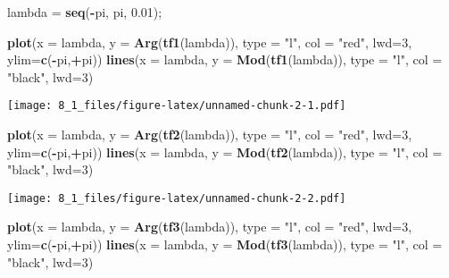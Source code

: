 \documentclass[]{article}
\newenvironment{Shaded}{\begin{snugshade}}{\end{snugshade}}
\newcommand{\KeywordTok}[1]{\textcolor[rgb]{0.13,0.29,0.53}{\textbf{#1}}}
\newcommand{\DataTypeTok}[1]{\textcolor[rgb]{0.13,0.29,0.53}{#1}}
\newcommand{\DecValTok}[1]{\textcolor[rgb]{0.00,0.00,0.81}{#1}}
\newcommand{\FloatTok}[1]{\textcolor[rgb]{0.00,0.00,0.81}{#1}}
\newcommand{\StringTok}[1]{\textcolor[rgb]{0.31,0.60,0.02}{#1}}
\newcommand{\OperatorTok}[1]{\textcolor[rgb]{0.81,0.36,0.00}{\textbf{#1}}}
\newcommand{\NormalTok}[1]{#1}
\begin{document}
\begin{Shaded}
\begin{Highlighting}[]
\NormalTok{lambda =}\StringTok{ }\KeywordTok{seq}\NormalTok{(}\OperatorTok{-}\NormalTok{pi, pi, }\FloatTok{0.01}\NormalTok{);}

\KeywordTok{plot}\NormalTok{(}\DataTypeTok{x =}\NormalTok{ lambda, }\DataTypeTok{y =} \KeywordTok{Arg}\NormalTok{(}\KeywordTok{tf1}\NormalTok{(lambda)), }\DataTypeTok{type =} \StringTok{"l"}\NormalTok{, }\DataTypeTok{col =} \StringTok{"red"}\NormalTok{, }\DataTypeTok{lwd=}\DecValTok{3}\NormalTok{, }\DataTypeTok{ylim=}\KeywordTok{c}\NormalTok{(}\OperatorTok{-}\NormalTok{pi,}\OperatorTok{+}\NormalTok{pi))}
\KeywordTok{lines}\NormalTok{(}\DataTypeTok{x =}\NormalTok{ lambda, }\DataTypeTok{y =} \KeywordTok{Mod}\NormalTok{(}\KeywordTok{tf1}\NormalTok{(lambda)), }\DataTypeTok{type =} \StringTok{"l"}\NormalTok{, }\DataTypeTok{col =} \StringTok{"black"}\NormalTok{, }\DataTypeTok{lwd=}\DecValTok{3}\NormalTok{)}
\end{Highlighting}
\end{Shaded}

\texttt{[image: 8\_1\_files/figure-latex/unnamed-chunk-2-1.pdf]}

\begin{Shaded}
\begin{Highlighting}[]
\KeywordTok{plot}\NormalTok{(}\DataTypeTok{x =}\NormalTok{ lambda, }\DataTypeTok{y =} \KeywordTok{Arg}\NormalTok{(}\KeywordTok{tf2}\NormalTok{(lambda)), }\DataTypeTok{type =} \StringTok{"l"}\NormalTok{, }\DataTypeTok{col =} \StringTok{"red"}\NormalTok{, }\DataTypeTok{lwd=}\DecValTok{3}\NormalTok{, }\DataTypeTok{ylim=}\KeywordTok{c}\NormalTok{(}\OperatorTok{-}\NormalTok{pi,}\OperatorTok{+}\NormalTok{pi))}
\KeywordTok{lines}\NormalTok{(}\DataTypeTok{x =}\NormalTok{ lambda, }\DataTypeTok{y =} \KeywordTok{Mod}\NormalTok{(}\KeywordTok{tf2}\NormalTok{(lambda)), }\DataTypeTok{type =} \StringTok{"l"}\NormalTok{, }\DataTypeTok{col =} \StringTok{"black"}\NormalTok{, }\DataTypeTok{lwd=}\DecValTok{3}\NormalTok{)}
\end{Highlighting}
\end{Shaded}

\texttt{[image: 8\_1\_files/figure-latex/unnamed-chunk-2-2.pdf]}

\begin{Shaded}
\begin{Highlighting}[]
\KeywordTok{plot}\NormalTok{(}\DataTypeTok{x =}\NormalTok{ lambda, }\DataTypeTok{y =} \KeywordTok{Arg}\NormalTok{(}\KeywordTok{tf3}\NormalTok{(lambda)), }\DataTypeTok{type =} \StringTok{"l"}\NormalTok{, }\DataTypeTok{col =} \StringTok{"red"}\NormalTok{, }\DataTypeTok{lwd=}\DecValTok{3}\NormalTok{, }\DataTypeTok{ylim=}\KeywordTok{c}\NormalTok{(}\OperatorTok{-}\NormalTok{pi,}\OperatorTok{+}\NormalTok{pi))}
\KeywordTok{lines}\NormalTok{(}\DataTypeTok{x =}\NormalTok{ lambda, }\DataTypeTok{y =} \KeywordTok{Mod}\NormalTok{(}\KeywordTok{tf3}\NormalTok{(lambda)), }\DataTypeTok{type =} \StringTok{"l"}\NormalTok{, }\DataTypeTok{col =} \StringTok{"black"}\NormalTok{, }\DataTypeTok{lwd=}\DecValTok{3}\NormalTok{)}
\end{Highlighting}
\end{Shaded}
\end{document}
